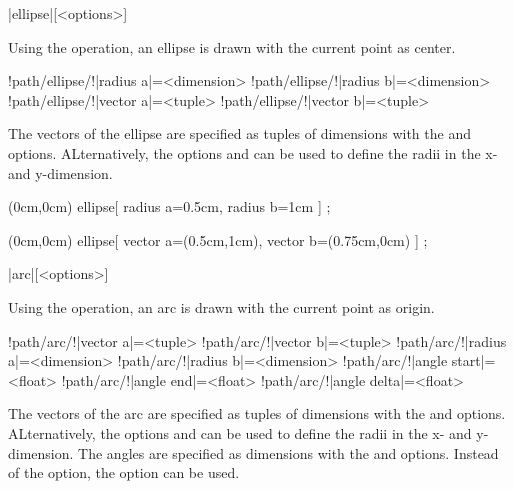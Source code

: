 \documentclass[a4paper]{article}
\begin{document}
{{\begin{macrodef}
|ellipse|[<options>]
\end{macrodef}
Using the  operation, an ellipse is drawn with the current point as center.

\begin{macrodef}
!path/ellipse/!|radius a|={<dimension>}
!path/ellipse/!|radius b|={<dimension>}
!path/ellipse/!|vector a|={<tuple>}
!path/ellipse/!|vector b|={<tuple>}
\end{macrodef}
The vectors of the ellipse are specified as tuples of dimensions with the  and  options. ALternatively, the options  and  can be used to define the radii in the x- and y-dimension.

\begin{codeexamplecolumns}
\begin{qdraw}
  \path[stroke] (0cm,0cm)
    ellipse[
      radius a={0.5cm},
      radius b={1cm}
    ] ;
\end{qdraw}
\end{codeexamplecolumns}

\begin{codeexamplecolumns}
\begin{qdraw}
  \path[stroke] (0cm,0cm)
    ellipse[
      vector a={(0.5cm,1cm)},
      vector b={(0.75cm,0cm)}
    ] ;
\end{qdraw}
\end{codeexamplecolumns}

\begin{macrodef}
|arc|[<options>]
\end{macrodef}
Using the  operation, an arc is drawn with the current point as origin.

\begin{macrodef}
!path/arc/!|vector a|={<tuple>}
!path/arc/!|vector b|={<tuple>}
!path/arc/!|radius a|={<dimension>}
!path/arc/!|radius b|={<dimension>}
!path/arc/!|angle start|={<float>}
!path/arc/!|angle end|={<float>}
!path/arc/!|angle delta|={<float>}
\end{macrodef}
The vectors of the arc are specified as tuples of dimensions with the  and  options. ALternatively, the options  and  can be used to define the radii in the x- and y-dimension. The angles are specified as dimensions with the  and  options. Instead of the  option, the option  can be used.

}}
\end{document}
